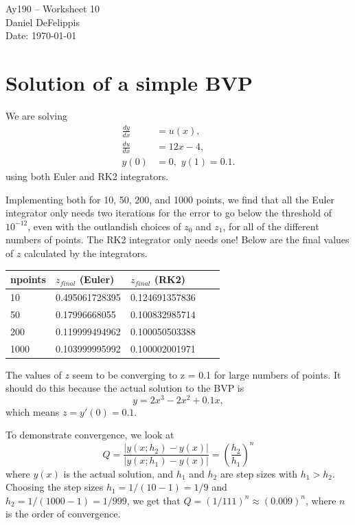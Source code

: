 \documentclass[11pt,letterpaper]{article}
\begin{document}
\begin{center}
\Large
Ay190 -- Worksheet 10\\
Daniel DeFelippis\\
Date: \today
\end{center}


\section*{Solution of a simple BVP}

We are solving
\begin{align*}
\frac{dy}{dx} &= u(x), \\
\frac{du}{dx} &= 12x - 4, \\
y(0) &= 0, \hspace{4pt} y(1) = 0.1. 
\end{align*}
using both Euler and RK2 integrators.

Implementing both for 10, 50, 200, and 1000 points, we find that all the 
Euler integrator only needs two iterations for the error to go below the 
threshold of $10^{-12}$, even with the outlandish choices of $z_0$ and $z_1$, for
all of the different numbers of points. The RK2 integrator only needs one! 
Below are the final values of $z$ calculated by the integrators.
\begin{center}
    \begin{tabular}{| l | l | l | l | l |}
    \hline
    npoints & $z_{final}$ (Euler) & $z_{final}$ (RK2) \\ \hline
    10 & 0.495061728395  & 0.124691357836 \\ \hline
    50 & 0.17996668055 & 0.100832985714 \\ \hline
    200 & 0.119999494962 & 0.100050503388 \\ \hline
    1000 & 0.103999995992 & 0.100002001971 \\
    \hline
    \end{tabular}
\end{center} 

The values of $z$ seem to be converging to z = 0.1 for large numbers of points.
It should do this because the actual solution to the BVP is 
$$y = 2x^3 - 2x^2 + 0.1x, $$
which means $z = y'(0) = 0.1$. 

To demonstrate convergence, we look at 
$$ Q = \frac{|y(x; h_2) - y(x)|}{|y(x; h_1) - y(x)|} = \left(\frac{h_2}{h_1}\right)^n $$
where $y(x)$ is the actual solution, and $h_1$ and $h_2$ are step sizes with $h_1 > h_2$. 
Choosing the step sizes $h_1 = 1/(10-1) = 1/9$ and $h_2 = 1/(1000-1) = 1/999$, we get that
$Q = (1/111)^n \approx (0.009)^n$, where $n$ is the order of convergence. 
\end{document}
